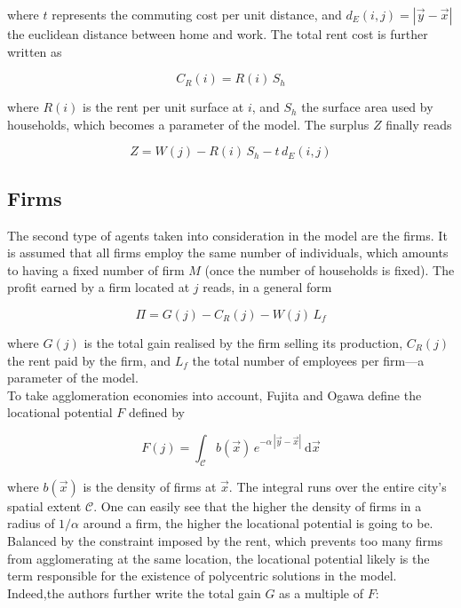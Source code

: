 where $t$ represents the commuting cost per unit distance, and $d_E(i,j) = \left| \vec{y} -
\vec{x} \right|$ the euclidean distance between home and work. The total rent
cost is further written as

\begin{equation}
    C_R\left(i\right) = R(i)\,S_h
\end{equation}

where $R(i)$ is the rent per unit surface at $i$, and $S_h$ the surface area
used by households, which becomes a parameter of the model.
The surplus $Z$
finally reads

\begin{equation}
    Z = W\left(j\right)
      - R\left(i\right)\,S_h
      - t\,d_E\left(i,j\right)
\end{equation} 


\subsection{Firms}
\label{sub:firms}

The second type of agents taken into consideration in the model are the firms.
It is assumed that all firms employ the same number of individuals, which
amounts to having a fixed number of firm $M$ (once the number of households is
fixed). The profit earned by a firm  located at $j$ reads, in a general
form

\begin{equation}
    \Pi = G\left(j\right) 
        - C_R\left(j\right) 
        -  W\left(j\right)\,L_f
\end{equation}

where $G(j)$ is the total gain realised by the firm selling its production,
$C_R(j)$ the rent paid by the firm, and $L_f$ the total number of employees per
firm---a parameter of the model.\\

To take agglomeration economies into account, Fujita and Ogawa define the
locational potential $F$ defined by

\begin{equation}
    F\left(j\right) = \int_{\mathcal{C}} b(\vec{x})\,e^{-\alpha\,\left|\vec{y}-\vec{x}\right|}\:\mathrm{d}\vec{x}
\end{equation}

where $b(\vec{x})$ is the density of firms at $\vec{x}$. The integral runs over
the entire city's spatial extent $\mathcal{C}$. One can easily see that the
higher the density of firms in a radius of $1/\alpha$ around a firm, the higher
the locational potential is going to be. Balanced by the constraint imposed by
the rent, which prevents too many firms from agglomerating at the same location,
the locational potential likely is the term responsible for the existence of
polycentric solutions in the model. Indeed,the authors further write the total
gain $G$ as a multiple of $F$:


